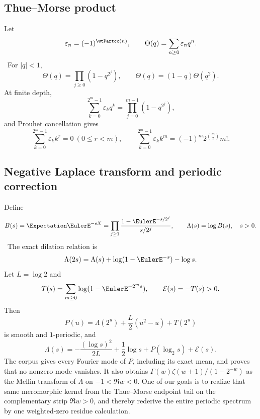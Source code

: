 \documentclass[11pt]{article}
\numberwithin{equation}{section}
\theoremstyle{definition}
\theoremstyle{remark}
\begin{document}
\subsection{Thue--Morse product}
Let
\begin{equation}
 \varepsilon_n=(-1)^{\wtPartcc(n)},\qquad
 \Theta(q)=\sum_{n\ge0}\varepsilon_n q^n.                 \label{p9:eq:Theta-def}
\end{equation}
\statusE\ For $|q|<1$,
\begin{equation}
 \boxed{\Theta(q)=\prod_{j\ge0}(1-q^{2^j}),
 \qquad \Theta(q)=(1-q)\Theta(q^2).}                       \label{p9:eq:Theta-product}
\end{equation}
At finite depth,
\begin{equation}
 \sum_{k=0}^{2^m-1}\varepsilon_k q^k
 =\prod_{j=0}^{m-1}(1-q^{2^j}),                            \label{p9:eq:TM-finite}
\end{equation}
and Prouhet cancellation gives
\begin{equation}
 \sum_{k=0}^{2^m-1}\varepsilon_k k^r=0\ (0\le r<m),
 \qquad
 \sum_{k=0}^{2^m-1}\varepsilon_k k^m=(-1)^m2^{\binom m2}m!. \label{p9:eq:Prouhet}
\end{equation}

\subsection{Negative Laplace transform and periodic correction}
Define
\begin{equation}
 B(s)=\Expectation\EulerE^{-sX}
 =\prod_{j\ge1}\frac{1-\EulerE^{-s/2^j}}{s/2^j},
 \qquad \Lambda(s)=\log B(s),\quad s>0.                   \label{p9:eq:B}
\end{equation}
\statusE\ The exact dilation relation is
\begin{equation}
 \Lambda(2s)=\Lambda(s)+\log(1-\EulerE^{-s})-\log s.           \label{p9:eq:Lambda-dilation}
\end{equation}
Let $L=\log2$ and
\begin{equation}
 T(s)=\sum_{m\ge0}\log(1-\EulerE^{-2^ms}),\qquad
 \mathcal E(s)=-T(s)>0.                                   \label{p9:eq:E-tail}
\end{equation}
Then
\begin{equation}
 P(u)=\Lambda(2^u)+\frac L2(u^2-u)+T(2^u)                 \label{p9:eq:P-def}
\end{equation}
is smooth and $1$-periodic, and
\begin{equation}
 \boxed{\Lambda(s)=-\frac{(\log s)^2}{2L}+\frac12\log s
 +P(\log_2s)+\mathcal E(s).}                              \label{p9:eq:Lambda-periodic}
\end{equation}
The corpus gives every Fourier mode of $P$, including its exact mean, and proves that no
nonzero mode vanishes.  It also obtains
$\Gamma(w)\zeta(w+1)/(1-2^{-w})$ as the Mellin transform of $\Lambda$ on
$-1<\Re w<0$.  One of our goals is to realize that same meromorphic kernel from the
Thue--Morse endpoint tail on the complementary strip $\Re w>0$, and thereby rederive the
entire periodic spectrum by one weighted-zero residue calculation.
\end{document}
